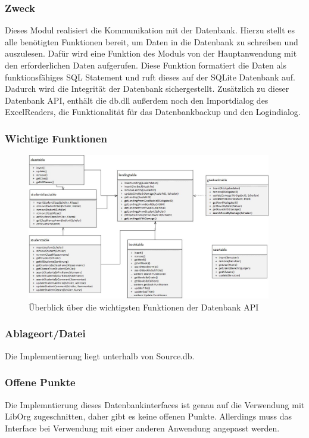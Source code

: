 \subsubsection{Zweck}
Dieses Modul realisiert die Kommunikation mit der Datenbank. Hierzu stellt es alle 
benötigten Funktionen bereit, um Daten in die Datenbank zu schreiben und auszulesen. 
Dafür wird eine Funktion des Moduls von der Hauptanwendung mit den erforderlichen 
Daten aufgerufen. Diese Funktion formatiert die Daten als funktionsfähiges SQL Statement
und ruft dieses auf der SQLite Datenbank auf. Dadurch wird die Integrität der Datenbank 
sichergestellt. Zusätzlich zu dieser Datenbank API, enthält die db.dll außerdem noch den 
Importdialog des ExcelReaders, die Funktionalität für das Datenbankbackup und den Logindialog.  
\subsubsection{Wichtige Funktionen}
\begin{figure}[H]
	\centering
		\includegraphics[width=0.95\textwidth]{figures/dbDLL.jpg}
	\caption{Überblick über die wichtigsten Funktionen der Datenbank API}
	\label{fig:dbDLL}
\end{figure}
\subsubsection{Ablageort/Datei}
Die Implementierung liegt unterhalb von Source.db.
\subsubsection{Offene Punkte}
Die Implemntierung dieses Datenbankinterfaces ist genau auf die Verwendung mit LibOrg
zugeschnitten, daher gibt es keine offenen Punkte. Allerdings muss das Interface bei 
Verwendung mit einer anderen Anwendung angepasst werden.


